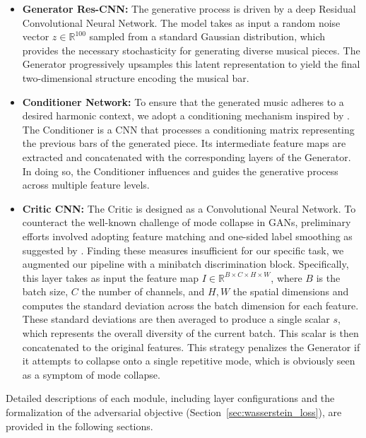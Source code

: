 \begin{itemize}
      \item \textbf{Generator Res-CNN:} The generative process is driven by a deep Residual Convolutional Neural Network.
            The model takes as input a random noise vector $z \in \mathbb{R}^{100}$ sampled from a standard Gaussian distribution, which provides the necessary stochasticity for generating diverse musical pieces.
            The Generator progressively upsamples this latent representation to yield the final two-dimensional structure encoding the musical bar.

      \item \textbf{Conditioner Network:} To ensure that the generated music adheres to a desired harmonic context, we adopt a conditioning mechanism inspired by \cite{Yang-2017}.
            The Conditioner is a CNN that processes a conditioning matrix representing the previous bars of the generated piece.
            Its intermediate feature maps are extracted and concatenated with the corresponding layers of the Generator.
            In doing so, the Conditioner influences and guides the generative process across multiple feature levels.

      \item \textbf{Critic CNN:} The Critic is designed as a Convolutional Neural Network.
            To counteract the well-known challenge of mode collapse in GANs, preliminary efforts involved adopting feature matching and one-sided label smoothing as suggested by \cite{Yang-2017}.
            Finding these measures insufficient for our specific task, we augmented our pipeline with a minibatch discrimination block.
            Specifically, this layer takes as input the feature map $I \in \mathbb{R}^{B \times C \times H \times W}$, where $B$ is the batch size, $C$ the number of channels, and $H, W$ the spatial dimensions and computes the standard deviation across the batch dimension for each feature. These standard deviations are then averaged to produce a single scalar $s$, which represents the overall diversity of the current batch. This scalar is then concatenated to the original features.
            This strategy penalizes the Generator if it attempts to collapse onto a single repetitive mode, which is obviously seen as a symptom of mode collapse.
\end{itemize}

Detailed descriptions of each module, including layer configurations and the formalization of the adversarial objective (Section~\ref{sec:wasserstein_loss}), are provided in the following sections.